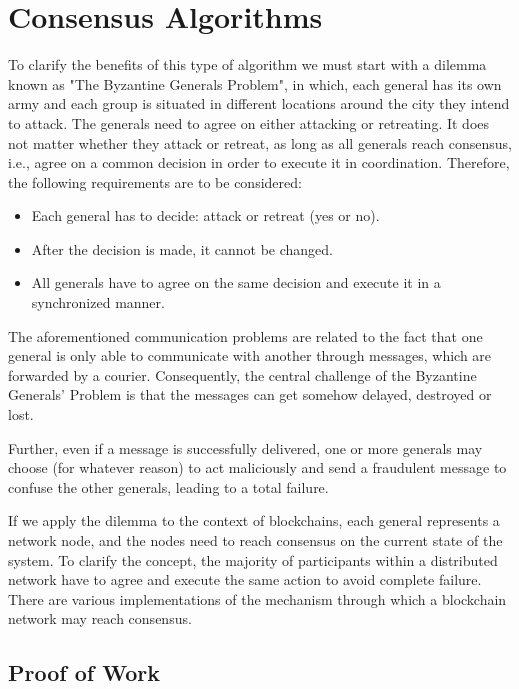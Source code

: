 \section{Consensus Algorithms}
\label{sec:consensus}

To clarify the benefits of this type of algorithm we must start with a 
dilemma known as "The Byzantine Generals Problem"\cite{byzantine}, in which, each 
general has its own army and each group is situated in different 
locations around the city they intend to attack. The generals need to 
agree on either attacking or retreating. It does not matter whether 
they attack or retreat, as long as all generals reach consensus, 
i.e., agree on a common decision in order to execute it in coordination. 
Therefore, the following requirements are to be considered:
\begin{itemize}
    \item Each general has to decide: attack or retreat (yes or no).
    \item After the decision is made, it cannot be changed.
    \item All generals have to agree on the same decision and execute it in a synchronized manner.
\end{itemize}
The aforementioned communication problems are related to the fact that 
one general is only able to communicate with another through messages, 
which are forwarded by a courier. Consequently, the central challenge 
of the Byzantine Generals’ Problem is that the messages can get somehow 
delayed, destroyed or lost.

Further, even if a message is successfully delivered, one or more 
generals may choose (for whatever reason) to act maliciously and send 
a fraudulent message to confuse the other generals, leading to a total 
failure.

If we apply the dilemma to the context of blockchains, each general 
represents a network node, and the nodes need to reach consensus on 
the current state of the system. To clarify the concept, the majority 
of participants within a distributed network have to agree and execute 
the same action to avoid complete failure.\cite{byzantine}\cite{binancevision}
There are various implementations of the mechanism through which a blockchain 
network may reach consensus.


\subsection{Proof of Work}
\label{sec:pow}

